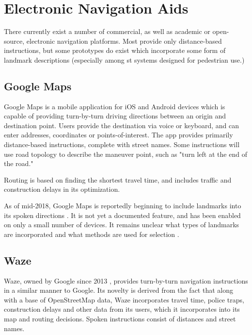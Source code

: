 \section{Electronic Navigation Aids}\label{Sect:eqns}

There currently exist a number of commercial, as well as academic or open-source, electronic navigation platforms. Most provide only distance-based instructions, but some prototypes do exist which incorporate some form of landmark descriptions (especially among st systems designed for pedestrian use.)

\subsection{Google Maps}
Google Maps is a mobile application for iOS and Android devices which is capable of providing turn-by-turn driving directions between an origin and destination point. Users provide the destination via voice or keyboard, and can enter addresses, coordinates or points-of-interest. The app provides primarily distance-based instructions, complete with street names. Some instructions will use road topology to describe the maneuver point, such as "turn left at the end of the road."

Routing is based on finding the shortest travel time, and includes traffic and construction delays in its optimization.

As of mid-2018, Google Maps is reportedly beginning to include landmarks into its spoken directions \cite{fingas_2018}. It is not yet a documented feature, and has been enabled on only a small number of devices. It remains unclear what types of landmarks are incorporated and what methods are used for selection \cite{fingas_2018}.

\subsection{Waze}
Waze, owned by Google since 2013 \cite{schneider_2014}, provides turn-by-turn navigation instructions in a similar manner to Google. Its novelty is derived from the fact that along with a base of OpenStreetMap data, Waze incorporates travel time, police traps, construction delays and other data from its users, which it incorporates into its map and routing decisions. Spoken instructions consist of distances and street names.